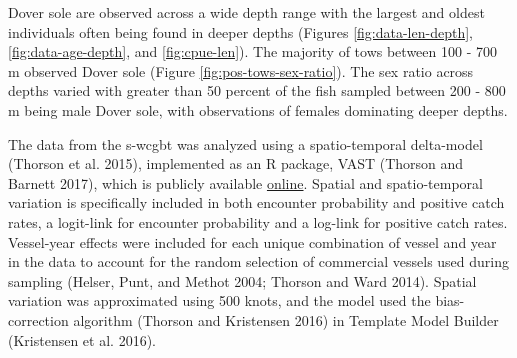 \documentclass[11pt,
  english,
  a4paper,
]{article}
\begin{document}
\leavevmode\tagmcend\tagstructend\par


Dover sole are observed across a wide depth range with the largest and oldest individuals often being found in deeper depths (Figures \ref{fig:data-len-depth}, \ref{fig:data-age-depth}, and \ref{fig:cpue-len}). The majority of tows between 100 - 700 m observed Dover sole (Figure \ref{fig:pos-tows-sex-ratio}). The sex ratio across depths varied with greater than 50 percent of the fish sampled between 200 - 800 m being male Dover sole, with observations of females dominating deeper depths.

\leavevmode\tagmcend\tagstructend\par


The data from the \gls{s-wcgbt} was analyzed using a spatio-temporal delta-model {(Thorson et al. 2015)\leavevmode\tagmcend\tagstructend}, implemented as an R package, VAST {(Thorson and Barnett 2017)\leavevmode\tagmcend\tagstructend}, which is publicly available {\href{https://github.com/James-Thorson/VAST}{online}\leavevmode\tagmcend\tagstructend}. Spatial and spatio-temporal variation is specifically included in both encounter probability and positive catch rates, a logit-link for encounter probability and a log-link for positive catch rates. Vessel-year effects were included for each unique combination of vessel and year in the data to account for the random selection of commercial vessels used during sampling {(Helser, Punt, and Methot 2004; Thorson and Ward 2014)\leavevmode\tagmcend\tagstructend}. Spatial variation was approximated using 500 knots, and the model used the bias-correction algorithm {(Thorson and Kristensen 2016)\leavevmode\tagmcend\tagstructend} in Template Model Builder {(Kristensen et al. 2016)\leavevmode\tagmcend\tagstructend}.

\leavevmode\tagmcend\tagstructend\par

\end{document}
